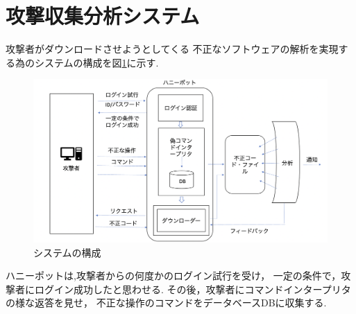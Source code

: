 \documentclass{entry}
\begin{document}
\section{攻撃収集分析システム}


攻撃者がダウンロードさせようとしてくる
不正なソフトウェアの解析を実現する為のシステムの構成を図\ref{fig:system}に示す.

\begin{figure}[htbp]
	\centering
 	\includegraphics[width=\linewidth]{hpsystem2.png}
 	\caption{システムの構成}\label{fig:system}
\end{figure}







ハニーポットは,攻撃者からの何度かのログイン試行を受け，
一定の条件で，攻撃者にログイン成功したと思わせる.
その後，攻撃者にコマンドインタープリタの様な返答を見せ，
不正な操作のコマンドをデータベースDBに収集する.
\end{document}
